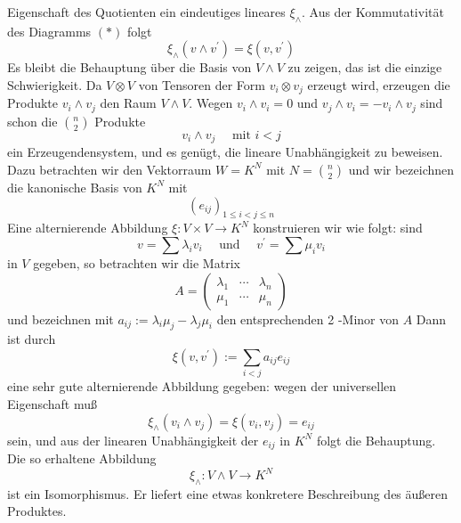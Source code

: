 Eigenschaft des Quotienten ein eindeutiges lineares
$\xi_{\wedge} .$ Aus der Kommutativität des Diagramms $(*)$ folgt
\[
\xi_{\wedge}\left(v \wedge v^{\prime}\right)=\xi\left(v, v^{\prime}\right)
\]
Es bleibt die Behauptung über die Basis von $V \wedge V$ zu zeigen, das ist die
einzige Schwierigkeit. Da $V \otimes V$ von Tensoren der Form
$v_{i} \otimes v_{j}$ erzeugt wird, erzeugen die Produkte $v_{i} \wedge v_{j}$
den Raum $V \wedge V .$ Wegen $v_{i} \wedge v_{i}=0$ und $v_{j} \wedge v_{i}=
-v_{i} \wedge v_{j}$ sind schon die $\binom{n}{2}$ Produkte
\[
v_{i} \wedge v_{j} \quad \text { mit } i<j
\]
ein Erzeugendensystem, und es genügt, die lineare Unabhängigkeit zu beweisen.
Dazu betrachten wir den Vektorraum $W=K^{N}$ mit $N=\binom{n}{2}$ und wir
bezeichnen die kanonische Basis von $K^{N}$ mit
\[
\left(e_{i j}\right)_{1 \leq i<j \leq n}
\]
Eine alternierende Abbildung $\xi: V \times V \rightarrow K^{N}$ konstruieren
wir wie folgt: sind
\[
v=\sum \lambda_{i} v_{i} \quad \text { und } \quad v^{\prime}=\sum \mu_{i} v_{i}
\]
in $V$ gegeben, so betrachten wir die Matrix
\[
A=\left(\begin{array}{lll}
\lambda_{1} & \cdots & \lambda_{n} \\
\mu_{1} & \cdots & \mu_{n}
\end{array}\right)
\]
und bezeichnen mit $a_{i j}:=\lambda_{i} \mu_{j}-\lambda_{j} \mu_{i}$ den 
entsprechenden 2 -Minor von $A$ Dann ist durch
\[
\xi\left(v, v^{\prime}\right):=\sum_{i<j} a_{i j} e_{i j}
\]
eine sehr gute alternierende Abbildung gegeben: wegen der universellen
Eigenschaft muß
\[
\xi_{\wedge}\left(v_{i} \wedge v_{j}\right)=\xi\left(v_{i}, v_{j}\right)=e_{i j}
\]
sein, und aus der linearen Unabhängigkeit der $e_{i j}$ in $K^{N}$ folgt die
Behauptung. Die so erhaltene Abbildung
\[
\xi_{\wedge}: V \wedge V \rightarrow K^{N}
\]
ist ein Isomorphismus. Er liefert eine etwas konkretere Beschreibung des
äußeren Produktes.


